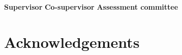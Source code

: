 \vspace*{5\baselineskip}

\begin{committee}
  \textbf{Supervisor}
  \newline {}
  \newline \linebreak
  \textbf{Co-supervisor}
  \newline \linebreak
  \textbf{Assessment committee}
\end{committee}

\pagebreak

\chapter*{Acknowledgements}\label{acknowledgements}